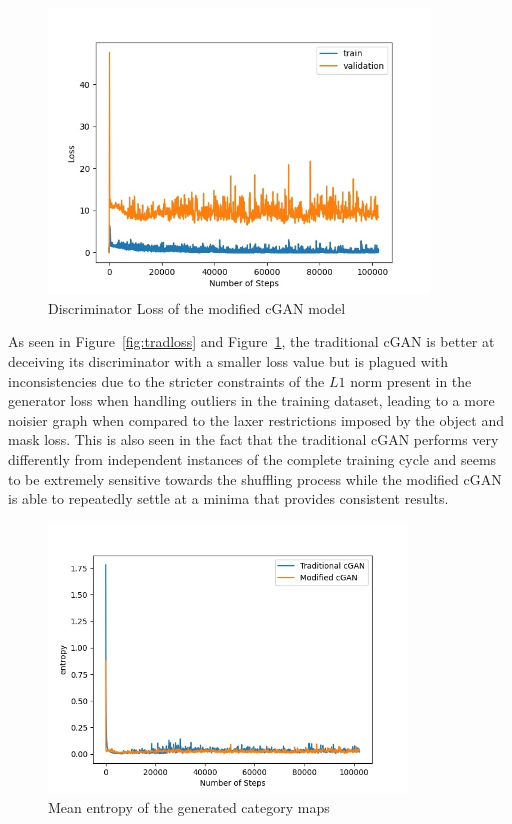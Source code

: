 \documentclass{Configuration_Files/PoliMi3i_thesis}
\begin{document}
\begin{figure}[H]
    \centering
    \includegraphics[width=0.9\textwidth]{mod_cgan_loss.jpg}
    \caption{Discriminator Loss of the modified cGAN model}
    \label{fig:modloss}
\end{figure}
As seen in Figure~\ref{fig:tradloss} and Figure~\ref{fig:modloss}, the traditional cGAN is better at deceiving its
discriminator with a smaller loss value but is plagued with inconsistencies due to the 
stricter constraints of the $L1$ norm present in the generator loss when handling 
outliers in the training dataset, leading to a more noisier graph when compared to 
the laxer restrictions imposed by the object and mask loss. This is also seen in the fact 
that the traditional cGAN performs very differently from independent instances of the 
complete training cycle and seems to be extremely sensitive towards the shuffling 
process while the modified cGAN is able to repeatedly settle at a minima that provides 
consistent results.
\begin{figure}[H]
    \centering
    \includegraphics[width=0.85\textwidth]{entropy.jpg}
    \caption{Mean entropy of the generated category maps}
    \label{fig:entropy}
\end{figure}
\end{document}
